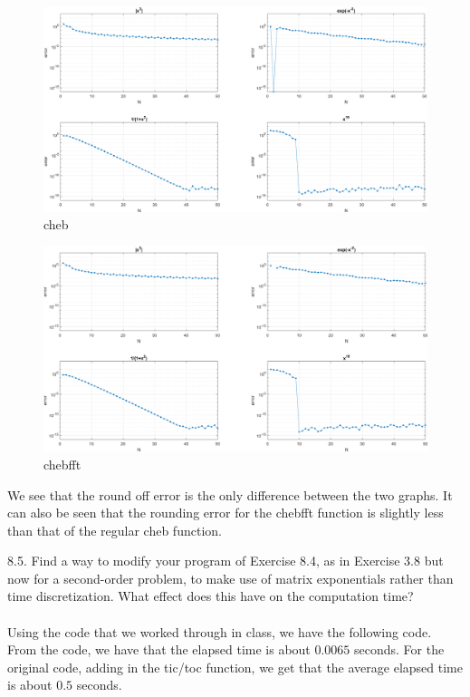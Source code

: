 \documentclass[12pt]{article}
\begin{document}
\begin{figure}[htp]
\centering
\includegraphics[scale=0.14]{8_3cheb.PNG}
\caption{cheb}
\end{figure}
\begin{figure}[htp]
\centering
\includegraphics[scale=0.14]{8_3chebfft.PNG}
\caption{chebfft}
\end{figure}

We see that the round off error is the only difference between the two graphs. It can also be seen that the rounding
error for the chebfft function is slightly less than that of the regular cheb function.

\newpage

\newpage

8.5. Find a way to modify your program of Exercise 8.4, as in Exercise 3.8 but now for a second-order problem, to make
use of matrix exponentials rather than time discretization. What effect does this have on the computation time?\\\\

Using the code that we worked through in class, we have the following code. From the code, we have that the elapsed time
is about $0.0065$ seconds. For the original code, adding in the tic/toc function, we get that the average elapsed time is
about $0.5$ seconds.
\end{document}

